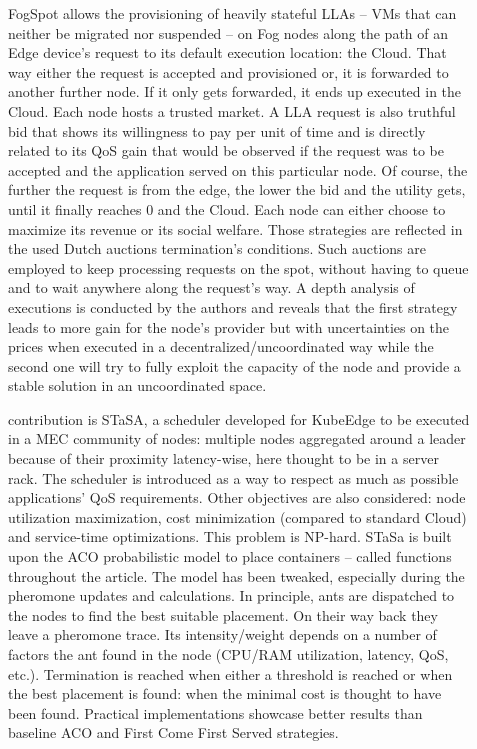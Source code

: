 \documentclass[11pt]{sdm}
\begin{document}
\begin{description}
	\item[] FogSpot allows the provisioning of heavily stateful \glspl{LLA} -- \glspl{VM} that can neither be migrated nor suspended -- on Fog nodes along the path of an Edge device's request to its default execution location: the Cloud. That way either the request is accepted and provisioned or, it is forwarded to another further node. If it only gets forwarded, it ends up executed in the Cloud.
		Each node hosts a trusted market. A \gls{LLA} request is also truthful bid that shows its willingness to pay per unit of time and is directly related to its \gls{QoS} gain that would be observed if the request was to be accepted and the application served on this particular node. Of course, the further the request is from the edge, the lower the bid and the utility gets, until it finally reaches 0 and the Cloud.
		Each node can either choose to maximize its revenue or its social welfare. Those strategies are reflected in the used Dutch auctions termination's conditions. Such auctions are employed to keep processing requests on the spot, without having to queue and to wait anywhere along the request's way. A depth analysis of executions is conducted by the authors and reveals that the first strategy leads to more gain for the node's provider but with uncertainties on the prices when executed in a decentralized/uncoordinated way while the second one will try to fully exploit the capacity of the node and provide a stable solution in an uncoordinated space.

	\item[] contribution is STaSA, a scheduler developed for KubeEdge to be executed in a \gls{MEC} community of nodes: multiple nodes aggregated around a leader because of their proximity latency-wise, here thought to be in a server rack. The scheduler is introduced as a way to respect as much as possible applications' \gls{QoS} requirements. Other objectives are also considered: node utilization maximization, cost minimization (compared to standard Cloud) and service-time optimizations. This problem is NP-hard. STaSa is built upon the \gls{ACO} probabilistic model to place containers -- called functions throughout the article. The model has been tweaked, especially during the pheromone updates and calculations. In principle, ants are dispatched to the nodes to find the best suitable placement. On their way back they leave a pheromone trace. Its intensity/weight depends on a number of factors the ant found in the node (CPU/RAM utilization, latency, QoS, etc.). Termination is reached when either a threshold is reached or when the best placement is found: when the minimal cost is thought to have been found. Practical implementations showcase better results than baseline \gls{ACO} and First Come First Served strategies.


\end{description}
\end{document}
